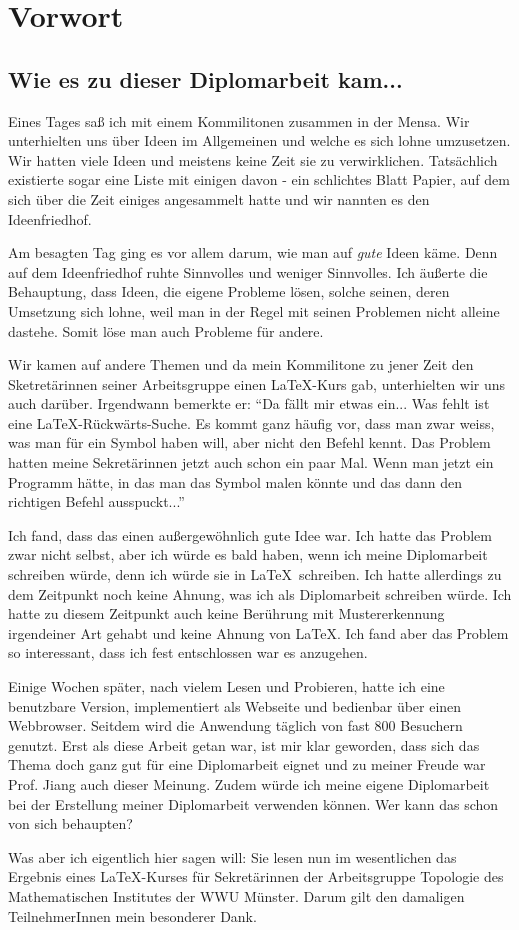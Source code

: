 \chapter{Vorwort}

\section*{Wie es zu dieser Diplomarbeit kam...}

Eines Tages saß ich mit einem Kommilitonen zusammen in der Mensa. Wir unterhielten uns über Ideen im Allgemeinen und welche es sich lohne umzusetzen. Wir hatten viele Ideen und meistens keine Zeit sie zu verwirklichen. Tatsächlich existierte sogar eine Liste mit einigen davon - ein schlichtes Blatt Papier, auf dem sich über die Zeit einiges angesammelt hatte und wir nannten es den Ideenfriedhof.

Am besagten Tag ging es vor allem darum, wie man auf {\em gute} Ideen käme. Denn auf dem Ideenfriedhof ruhte Sinnvolles und weniger Sinnvolles. Ich äußerte die Behauptung, dass Ideen, die eigene Probleme lösen, solche seinen, deren Umsetzung sich lohne, weil man in der Regel mit seinen Problemen nicht alleine dastehe. Somit löse man auch Probleme für andere.

Wir kamen auf andere Themen und da mein Kommilitone zu jener Zeit den Sketretärinnen seiner Arbeitsgruppe einen \LaTeX-Kurs gab, unterhielten wir uns auch darüber. Irgendwann bemerkte er: "`Da fällt mir etwas ein... Was fehlt ist eine LaTeX-Rückwärts-Suche. Es kommt ganz häufig vor, dass man zwar weiss, was man für ein Symbol haben will, aber nicht den Befehl kennt. Das Problem hatten meine Sekretärinnen jetzt auch schon ein paar Mal. Wenn man jetzt ein Programm hätte, in das man das Symbol malen könnte und das dann den richtigen Befehl ausspuckt..."'

Ich fand, dass das einen außergewöhnlich gute Idee war. Ich hatte das Problem zwar nicht selbst, aber ich würde es bald haben, wenn ich meine Diplomarbeit schreiben würde, denn ich würde sie in \LaTeX\ schreiben. Ich hatte allerdings zu dem Zeitpunkt noch keine Ahnung, was ich als Diplomarbeit schreiben würde. Ich hatte zu diesem Zeitpunkt auch keine Berührung mit Mustererkennung irgendeiner Art gehabt und keine Ahnung von \LaTeX. Ich fand aber das Problem so interessant, dass ich fest entschlossen war es anzugehen.

Einige Wochen später, nach vielem Lesen und Probieren, hatte ich eine benutzbare Version, implementiert als Webseite und bedienbar über einen Webbrowser. Seitdem wird die Anwendung täglich von fast 800 Besuchern genutzt. Erst als diese Arbeit getan war, ist mir klar geworden, dass sich das Thema doch ganz gut für eine Diplomarbeit eignet und zu meiner Freude war Prof. Jiang auch dieser Meinung. Zudem würde ich meine eigene Diplomarbeit bei der Erstellung meiner Diplomarbeit verwenden können. Wer kann das schon von sich behaupten?

Was aber ich eigentlich hier sagen will: Sie lesen nun im wesentlichen das Ergebnis eines \LaTeX-Kurses für Sekretärinnen der Arbeitsgruppe Topologie des Mathematischen Institutes der WWU Münster. Darum gilt den damaligen TeilnehmerInnen mein besonderer Dank.
